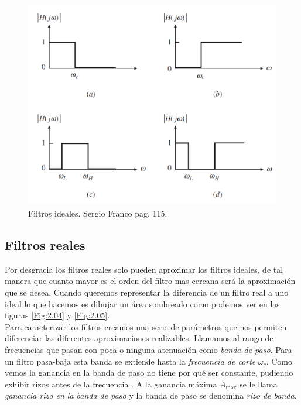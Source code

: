 \documentclass[11pt]{article} %
\begin{document}
\begin{figure}[h!] \centering
\includegraphics[scale=0.7]{2.2-Ideales.png}
\caption{Filtros ideales. Sergio Franco pag. 115.}
\label{Fig:2.03}
\end{figure}

\subsection{Filtros reales}

Por desgracia los filtros reales solo pueden aproximar los filtros ideales, de tal manera que cuanto mayor es el orden del filtro mas cercana será la aproximación que se desea. Cuando queremos representar la diferencia de un filtro real a uno ideal lo que hacemos es dibujar un área sombreado como podemos ver en las figuras \ref{Fig:2.04} y \ref{Fig:2.05}. \\ 

Para caracterizar los filtros creamos una serie de parámetros que nos permiten diferenciar las diferentes aproximaciones realizables. Llamamos al rango de frecuencias que pasan con poca o ninguna atenuación como \textit{banda de paso}. Para un filtro pasa-baja esta banda se extiende hasta la \textit{frecuencia de corte} $\omega_c$. Como vemos la ganancia en la banda de paso no tiene por qué ser constante, pudiendo exhibir rizos antes de la frecuencia . A la ganancia máxima $A_{\max}$ se le llama \textit{ganancia rizo en la banda de paso} y la banda de paso se denomina \textit{rizo de banda}. \\
\end{document}
